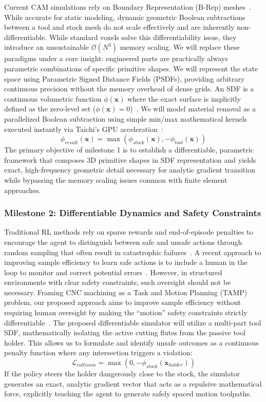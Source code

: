 \documentclass[11pt, letterpaper]{article}
\begin{document}
Current CAM simulations rely on Boundary Representation (B-Rep) meshes~\cite{nguyen2019triangular, bank2026fusioncut}.
While accurate for static modeling, dynamic geometric Boolean subtractions between a tool and stock mesh do not scale effectively and are inherently non-differentiable.
While standard voxels solve this differentiability issue, they introduce an unsustainable $\mathcal{O}(N^3)$ memory scaling.
We will replace these paradigms under a core insight: engineered parts are practically always parametric combinations of specific primitive shapes.
We will represent the state space using Parametric Signed Distance Fields (PSDFs), providing arbitrary continuous precision without the memory overhead of dense grids.
An SDF is a continuous volumetric function $\phi(\mathbf{x})$ where the exact surface is implicitly defined as the zero-level set ($\phi(\mathbf{x})=0$)~\cite{osher2001level}.
We will model material removal as a parallelized Boolean subtraction using simple min/max mathematical kernels executed instantly via Taichi's GPU acceleration~\cite{hu2019difftaichi}:
%
$$\phi_{result}(\mathbf{x}) = \max(\phi_{stock}(\mathbf{x}), -\phi_{tool}(\mathbf{x}))$$
%
The primary objective of milestone 1 is to establish a differentiable, parametric framework that composes 3D primitive shapes in SDF representation and yields exact, high-frequency geometric detail necessary for analytic gradient transition while bypassing the memory scaling issues common with finite element approaches.

\subsubsection*{Milestone 2: Differentiable Dynamics and Safety Constraints}

Traditional RL methods rely on sparse rewards and end-of-episode penalties to encourage the agent to distinguish between safe and unsafe actions through random sampling that often result in catastrophic failures~\cite{dulac2021challenges}.
A recent approach to improving sample efficiency to learn safe actions is to include a human in the loop to monitor and correct potential errors~\cite{saunders2017trial}.
However, in structured environments with clear safety constraints, such oversight should not be necessary.
Framing CNC machining as a Task and Motion Planning (TAMP) problem, our proposed approach aims to improve sample efficiency without requiring human oversight by making the ``motion'' safety constraints strictly differentiable~\cite{guthrie2022differentiable}.
The proposed differentiable simulator will utilize a multi-part tool SDF, mathematically isolating the active cutting flutes from the passive tool holder.
This allows us to formulate and identify unsafe outcomes as a continuous penalty function where any intersection triggers a violation:
%
$$\mathcal{L}_{collision} = \max(0, -\phi_{stock}(\mathbf{x}_{holder}))$$
%
If the policy steers the holder dangerously close to the stock, the simulator generates an exact, analytic gradient vector that acts as a repulsive mathematical force, explicitly teaching the agent to generate safely spaced motion toolpaths.
\end{document}
